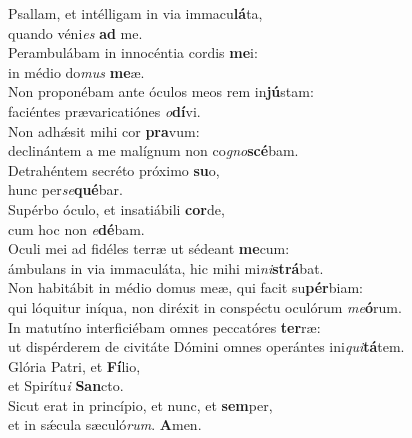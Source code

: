 \evenverse Psallam, et intélligam in via immacu\textbf{lá}ta,~\*\\
\evenverse quando véni\textit{es} \textbf{ad} me.\\
\oddverse Perambulábam in innocéntia cordis \textbf{me}i:~\*\\
\oddverse in médio do\textit{mus} \textbf{me}æ.\\
\evenverse Non proponébam ante óculos meos rem in\textbf{jú}stam:~\*\\
\evenverse faciéntes prævaricatiónes \textit{o}\textbf{dí}vi.\\
\oddverse Non adhǽsit mihi cor \textbf{pra}vum:~\*\\
\oddverse declinántem a me malígnum non co\textit{gno}\textbf{scé}bam.\\
\evenverse Detrahéntem secréto próximo \textbf{su}o,~\*\\
\evenverse hunc per\textit{se}\textbf{qué}bar.\\
\oddverse Supérbo óculo, et insatiábili \textbf{cor}de,~\*\\
\oddverse cum hoc non \textit{e}\textbf{dé}bam.\\
\evenverse Oculi mei ad fidéles terræ ut sédeant \textbf{me}cum:~\*\\
\evenverse ámbulans in via immaculáta, hic mihi mi\textit{ni}\textbf{strá}bat.\\
\oddverse Non habitábit in médio domus meæ, qui facit su\textbf{pér}biam:~\*\\
\oddverse qui lóquitur iníqua, non diréxit in conspéctu oculórum \textit{me}\textbf{ó}rum.\\
\evenverse In matutíno interficiébam omnes peccatóres \textbf{ter}ræ:~\*\\
\evenverse ut dispérderem de civitáte Dómini omnes operántes ini\textit{qui}\textbf{tá}tem.\\
\oddverse Glória Patri, et \textbf{Fí}lio,~\*\\
\oddverse et Spirítu\textit{i} \textbf{San}cto.\\
\evenverse Sicut erat in princípio, et nunc, et \textbf{sem}per,~\*\\
\evenverse et in sǽcula sæculó\textit{rum}. \textbf{A}men.\\
